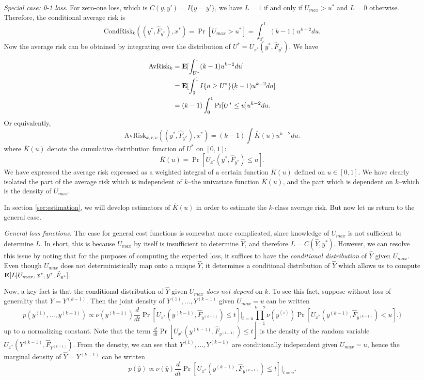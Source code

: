 \documentclass[12pt]{article}
\begin{document}
\noindent \emph{Special case: 0-1 loss}.
For zero-one loss, which is $C(y, y') = I\{y = y'\}$, we have $L=1$ if
and only if $U_{max} > u^*$ and $L=0$ otherwise.  Therefore, the
conditional average risk is
\[
\text{CondRisk}_k((y^*, \hat{F}_{y^*}), x^*) = \Pr[U_{max} > u^*] = \int_{u^*}^1 (k-1) u^{k-2} du.
\]
Now the average risk can be obtained by integrating over the distribution of $U^* = U_{x^*}(y^*, \hat{F}_{y^*})$.
We have
\begin{align*}
\text{AvRisk}_k &= \textbf{E}[ \int_{U^*}^1 (k-1) u^{k-2} du] 
\\&= \textbf{E}[\int_0^1 I\{u \geq U^*\} (k-1) u^{k-2} du ]
\\&= (k-1) \int_0^1 \Pr[U^* \leq u] u^{k-2} du.
\end{align*}
Or equivalently,
\[
\text{AvRisk}_{k, r, \nu}((y^*, \hat{F}_{y^*}), x^*) = (k-1) \int \bar{K}(u) u^{k-2} du.
\]
where $\bar{K}(u)$ denote the cumulative distribution function of $U^*$ on $[0,1]$:
\[
\bar{K}(u) = \Pr[U_{x^*}(y^*, \hat{F}_{y^*}) \leq u].
\]
We have expressed the average risk expressed as a weighted integral of
a certain function $\bar{K}(u)$ defined on $u \in [0,1]$.  We have
clearly isolated the part of the average risk which is independent of
$k$--the univariate function $\bar{K}(u)$, and the part which is
dependent on $k$--which is the density of $U_{max}$.

In section \ref{sec:estimation}, we will develop estimators of
$\bar{K}(u)$ in order to estimate the $k$-class average risk.
But now let us return to the general case.
\newline

\noindent \emph{General loss functions.}
The case for general cost functions is somewhat more complicated,
since knowledge of $U_{max}$ is not sufficient to determine $L$.  In
short, this is because $U_{max}$ by itself is insufficient to
determine $\hat{Y}$, and therefore $L=C(\hat{Y}, y^*)$.  However, we
can resolve this issue by noting that for the purposes of computing
the expected loss, it suffices to have the \emph{conditional
distribution} of $\hat{Y}$ given $U_{max}$.  Even though $U_{max}$
does not deterministically map onto a unique $\hat{Y}$, it determines
a conditional distribution of $\hat{Y}$ which allows us to compute
$\textbf{E}[L|U_{max}, x^*, y^*, \hat{F}_{y^*}]$.

Now, a key fact is that the conditional distribution of $\hat{Y}$
given $U_{max}$ \emph{does not depend} on $k$.  To see this fact,
suppose without loss of generality that $\hat{Y} = Y^{(k-1)}.$ Then
the joint density of $Y^{(1)},\hdots, Y^{(k-1)}$ given $U_{max} =
u$ can be written
\[
p(y^{(1)},\hdots, y^{(k-1)}) \propto 
\nu(y^{(k-1)})\frac{d}{dt}\Pr[U_{x^*}(y^{(k-1)}, \hat{F}_{y^{(k-1)}}) \leq t]|_{t=u}
\prod_{i=1}^{k-2}\nu(y^{(i)})\Pr[U_{x^*}(y^{(k-1)}, \hat{F}_{y^{(k-1)}}) < u].
\}
\]
up to a normalizing constant.  Note that the term
$\frac{d}{dt}\Pr[U_{x^*}(y^{(k-1)}, \hat{F}_{y^{(k-1)}}) \leq t]$ is the
density of the random variable
$U_{x^*}(Y^{(k-1)}, \hat{F}_{Y^{(k-1)}})$. From the density, we can see
that $Y^{(1)},\hdots, Y^{(k-1)}$ are conditionally independent given
$U_{max} = u$, hence the marginal density of $\hat{Y}=Y^{(k-1)}$ can
be written
\[
p(\hat{y}) \propto \nu(\hat{y})\frac{d}{dt}\Pr[U_{x^*}(y^{(k-1)}, \hat{F}_{y^{(k-1)}}) \leq t]|_{t=u}.
\]
\end{document}
